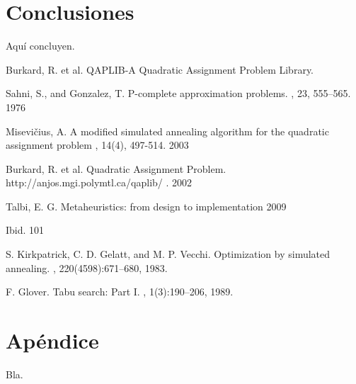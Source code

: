\documentclass{ci5652}
\begin{document}
\begin{table}
\end{table}

\begin{table}
\end{table}


\section*{Conclusiones}

Aquí concluyen.


\small


\begin{thebibliography}{99}

Burkard, R. et al.
\newblock QAPLIB-A Quadratic Assignment Problem Library.

Sahni, S., and Gonzalez, T.
\newblock P-complete approximation problems.
, 23, 555–565. 1976

Misevičius, A.
\newblock A modified simulated annealing algorithm for the quadratic assignment problem
, 14(4), 497-514. 2003

Burkard, R. et al.
\newblock Quadratic Assignment Problem.
\newblock http://anjos.mgi.polymtl.ca/qaplib/ . 2002

Talbi, E. G. 
\newblock Metaheuristics: from design to implementation
 2009

Ibid. 101

S. Kirkpatrick, C. D. Gelatt, and M. P. Vecchi. 
\newblock Optimization by simulated annealing.
, 220(4598):671–680, 1983.

F. Glover. 
\newblock Tabu search: Part I. 
, 1(3):190–206, 1989.


\end{thebibliography}


\newpage
\section*{Apéndice}

Bla.
\end{document}
